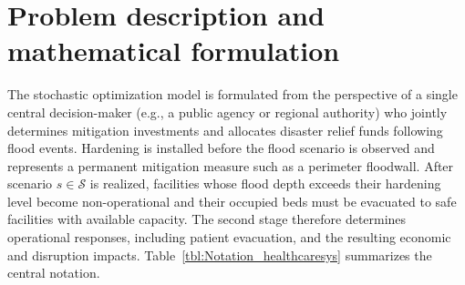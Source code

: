 \documentclass[preprint,11pt,authoryear]{elsarticle}
\begin{document}
\section{Problem description and mathematical formulation}
\label{sec:model}

The stochastic optimization model is formulated from the perspective of a single central decision-maker (e.g., a public agency or regional authority) who jointly determines mitigation investments and allocates disaster relief funds following flood events. Hardening is installed before the flood scenario is observed and represents a permanent mitigation measure such as a perimeter floodwall. After scenario $s\in\mathcal{S}$ is realized, facilities whose flood depth exceeds their hardening level become non-operational and their occupied beds must be evacuated to safe facilities with available capacity. The second stage therefore determines operational responses, including patient
evacuation, and the resulting economic and disruption impacts. Table~\ref{tbl:Notation_healthcaresys} summarizes the central notation.
\end{document}
